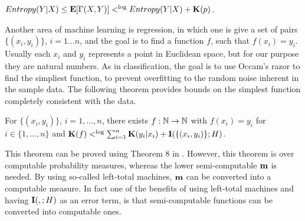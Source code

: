 \documentclass[11pt]{article}\textwidth 6.5in\textheight 9in
\begin{document}
\begin{thr} $Entropy(Y|X)\leq{\mathbf E}[\Gamma(X,Y)]<^{\log} Entropy(Y|X)+{\mathbf K}(p)$.
\end{thr}

Another area of machine learning is regression, in which one is give a set of pairs $\{(x_i,y_i)\}$, $i=1\dots n$, and the goal is to find a function $f$, such that $f(x_i)=y_i$. Usually each $x_i$ and $y_i$ represents a point in Euclidean space, but for our purpose they are natural numbers. As in classification, the goal is to use Occam's razor to find the simpliest function, to prevent overfitting to the random noise inherent in the sample data. The following theorem provides bounds on the simplest function completely consistent with the data.
\begin{thr}
For $\{(x_i,y_i)\}$, $i=1,\dots,n$,  there exists $f:\mathbb{N}\rightarrow\mathbb{N}$ with $f(x_i)= y_i$ for $i\in\{1,\dots,n\}$ and ${\mathbf K}(f) <^{\log} \sum_{i=1}^n{\mathbf K}(y_i|x_i)+{\mathbf I}(\{(x_i,y_i)\};H)$.
\end{thr}

This theorem can be proved using Theorem 8 in \cite{EpsteinDerandom22}. However, this theorem is over computable probability measures, whereas the lower semi-computable ${\mathbf {m}}$ is needed. By using so-called left-total machines, ${\mathbf {m}}$ can be converted into a computable measure. In fact one of the benefits of using left-total machines and having ${\mathbf I}(,;H)$ as an error term, is that semi-computable functions can be converted into computable ones.
 

\end{document}

